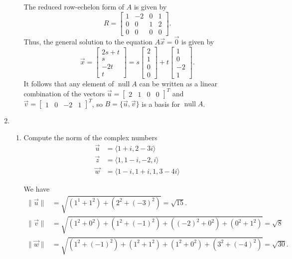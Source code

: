\documentclass[letterpaper,12pt]{article}
\newcommand{\len}[1]{\lVert #1\rVert}
\DeclareMathOperator{\nul}{null}
\begin{document}
\begin{enumerate}
\begin{enumerate}
The reduced row-echelon form of $A$ is given by
\[
 R = \begin{bmatrix} 1&-2&0&1\\0&0&1&2\\0&0&0&0\end{bmatrix}.
\]
Thus, the general solution to the equation $A\vec{x}=\vec{0}$ is given by 
\[
 \vec{x} = \begin{bmatrix}2s+t\\s\\-2t\\t\end{bmatrix} = s\begin{bmatrix}2\\1\\0\\0\end{bmatrix}+t\begin{bmatrix}1\\0\\-2\\1\end{bmatrix}.
\]
It follows that any element of $\nul A$ can be written as a linear combination of the vectors $\vec{u}=\begin{bmatrix}2&1&0&0\end{bmatrix}^T$ and $\vec{v}=\begin{bmatrix}1&0&-2&1\end{bmatrix}^T$, so $B=\{\vec{u},\vec{v}\}$ is a basis for $\nul A$.

\bigskip

\end{enumerate}
\item 
\begin{enumerate}
 \item Compute the norm of the complex numbers
\begin{align*}
 \vec{u} & = \langle 1+i, 2-3i\rangle\\
 \vec{z} & = \langle 1, 1-i, -2, i\rangle\\
 \vec{w} & = \langle 1-i, 1+i, 1, 3-4i\rangle
\end{align*}

\bigskip

We have
\begin{align*}
 \len{\vec{u}}&=\sqrt{(1^1+1^2)+(2^2+(-3)^2)}=\sqrt{15}.\\
 \len{\vec{v}}&=\sqrt{(1^2+0^2)+(1^2+(-1)^2)+((-2)^2+0^2)+(0^2+1^2)} = \sqrt{8}\\
 \len{\vec{w}}&=\sqrt{(1^2+(-1)^2)+(1^2+1^2)+(1^2+0^2)+(3^2+(-4)^2)} = \sqrt{30}.
\end{align*}



\end{enumerate}
\end{enumerate}
\end{document}
